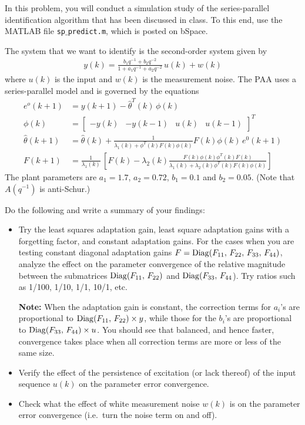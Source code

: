 \item
In this problem, you will conduct a simulation study of the series-parallel  identification algorithm that has been discussed in class. To this end, use the MATLAB file {\tt sp$\_$predict.m}, which is posted on bSpace.

The system that we want to identify is the second-order system given by
\begin{align*}
    y(k) = \frac{b_1q^{-1} + b_2 q^{-2}}{1 + a_1 q^{-1} + a_2 q^{-2}}\, u(k) + w(k)
\end{align*}
where $u(k)$ is the input and $w(k)$ is the measurement noise.
The PAA uses a series-parallel model and is governed by the equations
\begin{align*}
    e^o(k+1) & =  y(k+1) - \hat{\theta}^T(k) \, \phi(k) \\
    \phi(k) & = \begin{bmatrix}
            -y(k) & -y(k-1) & u(k) & u(k-1)
        \end{bmatrix}^T \\
    \hat{\theta}(k+1) & = \hat{\theta}(k) 
        + \frac{1}{\lambda_1(k) + \phi^T(k) F(k) \phi(k)} F(k) \phi(k)\,e^0(k+1) \\
    F(k+1) & = \frac{1}{\lambda_1(k)} \, \left[ F(k) - \lambda_2(k) 
        \frac{ F(k)\phi(k)\phi^T(k)F(k) }{ \lambda_1(k) + \lambda_2(k) \phi^T(k)F(k) \phi(k) } \right] \;
\end{align*}
The plant parameters are $a_1 = 1.7$, $a_2 = 0.72$, $b_1 =0.1$ and $b_2=0.05$. (Note that $A(q^{-1})$ is anti-Schur.)

Do the following and write a summary of your findings:
\begin{itemize}
    \item
    Try the least squares adaptation gain, least square adaptation  gains with a forgetting factor, and constant adaptation gains. For the cases when you are testing constant diagonal adaptation gains
    $F = {\rm Diag}(F_{11},\,F_{22},\,F_{33},\,F_{44})$, analyze the effect on the parameter convergence of the relative magnitude between  the submatrices ${\rm Diag}(F_{11},\,F_{22})$ and ${\rm Diag}(F_{33},\,F_{44}$).  Try ratios such as 1/100, 1/10, 1/1, 10/1, etc.

    \textbf{Note:} When the adaptation gain is constant, the correction terms for $a_i$'s are proportional to  ${\rm Diag}(F_{11},\,F_{22}) \times y$, while those for the $b_i$'s are proportional to  ${\rm Diag}(F_{33},\,F_{44}) \times u$. You should see that balanced, and hence faster, convergence takes place when all correction terms are more or less of the same size.

    \item
    Verify the effect of the persistence of excitation (or lack thereof) of the input sequence $u(k)$ on the parameter error convergence.

    \item
    Check what the effect of white measurement noise $w(k)$ is on the parameter error convergence (i.e.\ turn  the noise term on and off).
\end{itemize}

